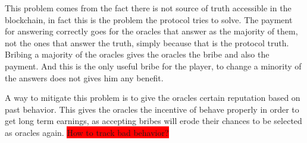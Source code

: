 This problem comes from the fact there is not source of truth accessible in the
  blockchain, in fact this is the problem the protocol tries to solve.
The payment for answering correctly goes for the oracles that answer as the
  majority of them, not the ones that answer the truth, simply because that is
  the protocol truth.
Bribing a majority of the oracles gives the oracles the bribe and also the
  payment.
And this is the only useful bribe for the player, to change a minority of the
  answers does not gives him any benefit.

A way to mitigate this problem is to give the oracles certain reputation based
  on past behavior.
This gives the oracles the incentive of behave properly in order to get long
  term earnings, as accepting bribes will erode their chances to be selected as
  oracles again.
\colorbox{red}{How to track bad behavior?}
